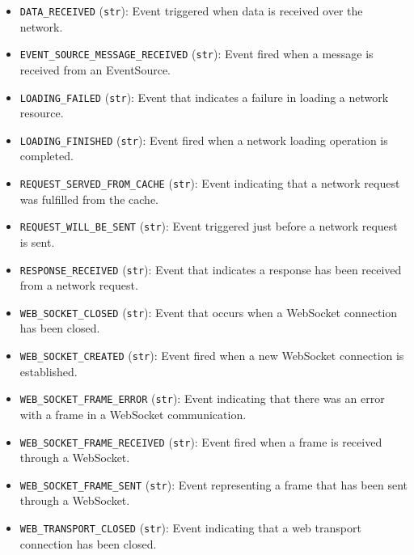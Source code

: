 \documentclass{article}
\begin{document}
\begin{itemize}
    \item \lstinline[style=pythonstyle]|DATA_RECEIVED| (\lstinline[style=pythonstyle]|str|): Event triggered when data is received over the network.
    \item \lstinline[style=pythonstyle]|EVENT_SOURCE_MESSAGE_RECEIVED| (\lstinline[style=pythonstyle]|str|): Event fired when a message is received from an EventSource.
    \item \lstinline[style=pythonstyle]|LOADING_FAILED| (\lstinline[style=pythonstyle]|str|): Event that indicates a failure in loading a network resource.
    \item \lstinline[style=pythonstyle]|LOADING_FINISHED| (\lstinline[style=pythonstyle]|str|): Event fired when a network loading operation is completed.
    \item \lstinline[style=pythonstyle]|REQUEST_SERVED_FROM_CACHE| (\lstinline[style=pythonstyle]|str|): Event indicating that a network request was fulfilled from the cache.
    \item \lstinline[style=pythonstyle]|REQUEST_WILL_BE_SENT| (\lstinline[style=pythonstyle]|str|): Event triggered just before a network request is sent.
    \item \lstinline[style=pythonstyle]|RESPONSE_RECEIVED| (\lstinline[style=pythonstyle]|str|): Event that indicates a response has been received from a network request.
    \item \lstinline[style=pythonstyle]|WEB_SOCKET_CLOSED| (\lstinline[style=pythonstyle]|str|): Event that occurs when a WebSocket connection has been closed.
    \item \lstinline[style=pythonstyle]|WEB_SOCKET_CREATED| (\lstinline[style=pythonstyle]|str|): Event fired when a new WebSocket connection is established.
    \item \lstinline[style=pythonstyle]|WEB_SOCKET_FRAME_ERROR| (\lstinline[style=pythonstyle]|str|): Event indicating that there was an error with a frame in a WebSocket communication.
    \item \lstinline[style=pythonstyle]|WEB_SOCKET_FRAME_RECEIVED| (\lstinline[style=pythonstyle]|str|): Event fired when a frame is received through a WebSocket.
    \item \lstinline[style=pythonstyle]|WEB_SOCKET_FRAME_SENT| (\lstinline[style=pythonstyle]|str|): Event representing a frame that has been sent through a WebSocket.
    \item \lstinline[style=pythonstyle]|WEB_TRANSPORT_CLOSED| (\lstinline[style=pythonstyle]|str|): Event indicating that a web transport connection has been closed.

\end{itemize}
\end{document}
